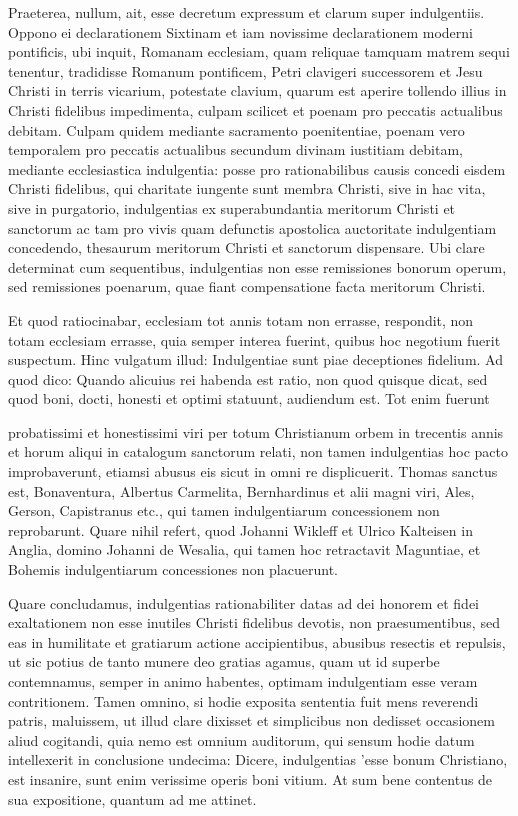 Praeterea, nullum, ait, esse decretum expressum et clarum super indulgentiis. Oppono ei declarationem Sixtinam et iam novissime declarationem moderni pontificis, ubi inquit, Romanam ecclesiam, quam reliquae tamquam matrem sequi tenentur, tradidisse Romanum pontificem, Petri clavigeri successorem et Jesu Christi in terris vicarium, potestate clavium, quarum est aperire tollendo illius in Christi fidelibus impedimenta, culpam scilicet et \marginpar{\small[353]} poenam pro peccatis actualibus debitam. Culpam quidem mediante sacramento poenitentiae, poenam vero temporalem pro peccatis actualibus secundum divinam iustitiam debitam, mediante ecclesiastica indulgentia: posse pro rationabilibus causis concedi eisdem Christi fidelibus, qui charitate iungente sunt membra Christi, sive in hac vita, sive in purgatorio, indulgentias ex superabundantia meritorum Christi et sanctorum ac tam pro vivis quam defunctis apostolica auctoritate indulgentiam concedendo, thesaurum meritorum Christi et sanctorum dispensare. Ubi clare determinat cum sequentibus, indulgentias non esse remissiones bonorum operum, sed remissiones poenarum, quae fiant compensatione facta meritorum Christi.

Et quod ratiocinabar, ecclesiam tot annis totam non errasse, respondit, non totam ecclesiam errasse, quia semper interea fuerint, quibus hoc negotium fuerit suspectum. Hinc vulgatum illud: Indulgentiae sunt piae deceptiones fidelium. Ad quod dico: Quando alicuius rei habenda est ratio, non quod quisque dicat, sed quod boni, docti, honesti et optimi statuunt, audiendum est. Tot enim fuerunt

probatissimi et honestissimi viri per totum Christianum orbem in trecentis annis et horum aliqui in catalogum sanctorum relati, non tamen indulgentias hoc pacto improbaverunt, etiamsi abusus eis sicut in omni re displicuerit. Thomas sanctus est, Bonaventura, Albertus Carmelita, Bernhardinus et alii magni viri, Ales, Gerson, Capistranus etc., qui tamen indulgentiarum concessionem non reprobarunt. Quare nihil refert, quod Johanni Wikleff et Ulrico Kalteisen in Anglia, domino Johanni de Wesalia, qui tamen hoc retractavit Maguntiae, et Bohemis indulgentiarum concessiones non placuerunt.

Quare concludamus, indulgentias rationabiliter datas ad dei honorem et fidei exaltationem non esse inutiles Christi fidelibus devotis, non praesumentibus, sed eas in humilitate et gratiarum actione accipientibus, abusibus resectis et repulsis, ut sic potius de tanto munere deo gratias agamus, quam ut id superbe contemnamus, semper in animo habentes, optimam indulgentiam esse veram contritionem. Tamen omnino, si hodie exposita sententia fuit mens reverendi patris, maluissem, ut illud clare dixisset et simplicibus non dedisset occasionem aliud cogitandi, quia nemo est omnium auditorum, qui sensum hodie datum intellexerit in conclusione undecima: Dicere, indulgentias 'esse bonum Christiano, est insanire, sunt enim verissime operis boni vitium. At sum bene contentus de sua expositione, quantum ad me attinet.

